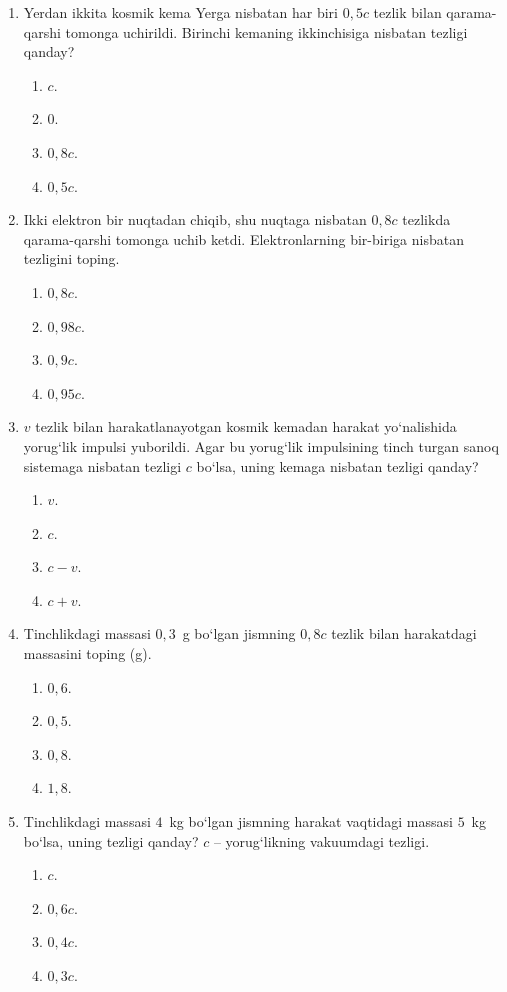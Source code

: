 \begin{enumerate}
\item Yerdan ikkita kosmik kema Yerga nisbatan har biri $0,5c$ tezlik bilan qarama-qarshi tomonga uchirildi. Birinchi kemaning ikkinchisiga nisbatan tezligi qanday?
\begin{enumerate}[label=\Alph*)]
\item $c$.
\item $0$.
\item $0,8c$.
\item $0,5c$.
\end{enumerate}

\item Ikki elektron bir nuqtadan chiqib, shu nuqtaga nisbatan $0,8c$ tezlikda qarama-qarshi tomonga uchib ketdi. Elektronlarning bir-biriga nisbatan tezligini toping.
\begin{enumerate}[label=\Alph*)]
\item $0,8c$.
\item $0,98c$.
\item $0,9c$.
\item $0,95c$.
\end{enumerate}

\item $v$ tezlik bilan harakatlanayotgan kosmik kemadan harakat yo‘nalishida yorug‘lik impulsi yuborildi. Agar bu yorug‘lik impulsining tinch turgan sanoq sistemaga nisbatan tezligi $c$ bo‘lsa, uning kemaga nisbatan tezligi qanday?
\begin{enumerate}[label=\Alph*)]
\item $v$.
\item $c$.
\item $c-v$.
\item $c+v$.
\end{enumerate}

\item Tinchlikdagi massasi $0,3$~g bo‘lgan jismning $0,8c$ tezlik bilan harakatdagi massasini toping (g).
\begin{enumerate}[label=\Alph*)]
\item $0,6$.
\item $0,5$.
\item $0,8$.
\item $1,8$.
\end{enumerate}

\item Tinchlikdagi massasi $4$~kg bo‘lgan jismning harakat vaqtidagi massasi $5$~kg bo‘lsa, uning tezligi qanday? $c$ -- yorug‘likning vakuumdagi tezligi.
\begin{enumerate}[label=\Alph*)]
\item $c$.
\item $0,6c$.
\item $0,4c$.
\item $0,3c$.
\end{enumerate}


\end{enumerate}
